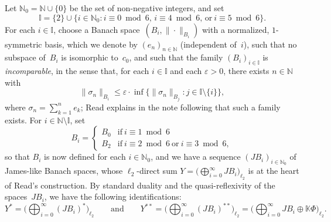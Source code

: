\documentclass[12pt,reqno]{amsart}
\theoremstyle{definition}
\numberwithin{equation}{section}
\renewcommand{\le}{\ensuremath{\leqslant}}
\newcommand{\N}{\mathbb{N}}
\renewcommand{\epsilon}{\ensuremath{\varepsilon}}
\begin{document}
Let $\N_0 = \N\cup\{0\}$ be the set of non-negative integers, and set
\[ \mathbb{I} = \{2\}\cup\{i\in\N_0 : i\equiv 0\bmod 6,\, i\equiv 
4\bmod 6,\, \text{or}\ i\equiv 5\bmod 6\}. \] For each
$i\in\mathbb{I}$, choose a Banach space~$(B_i,\|\cdot\|_{B_i})$ with a
normalized, $1$-symmetric basis, which we denote by $(e_n)_{n\in\N}$
(independent of~$i$), such that no subspace of~$B_i$ is isomorphic
to~$c_0$, and such that the family $(B_i)_{i\in\mathbb{I}}$ is
\emph{incomparable}, in the sense that, for each $i\in\mathbb{I}$ and
each $\epsilon>0$, there exists $n\in\N$ with
\begin{equation}\label{ReadDefIncomp}
\|\sigma_n\|_{B_i}\le\epsilon\cdot\inf\bigl\{\|\sigma_n\|_{B_j} :
j\in\mathbb{I}\setminus\{i\}\bigr\}, \end{equation} where $\sigma_n = \sum_{k=1}^n
e_k$; Read explains in the note following \cite[Definition~3.2]{read}
that such a family exists. For $i\in\N\setminus\mathbb{I}$, set
\begin{equation}\label{subspaceYiforinotinI} 
 B_i = \begin{cases} B_0 & \text{if}\ i\equiv 1\bmod 6\\ B_2 &
   \text{if}\ i\equiv 2\bmod 6\ \text{or}\ i\equiv 3\bmod
   6, \end{cases} \end{equation} so that $B_i$ is now defined for each
$i\in\N_0$, and we have a sequence $(JB_i)_{i\in\N_0}$ of
James-like Banach spaces, whose $\ell_2$-direct sum $Y =
\bigl(\bigoplus_{i=0}^\infty JB_i\bigr)_{\ell_2}$ is at the heart of
Read's construction.  By standard duality and the quasi-reflexivity of
the spaces~$JB_i$, we have the following identifications:
\begin{equation}\label{dualandbidualofY}
Y^* = \biggl(\bigoplus_{i=0}^\infty (JB_i)^*\biggr)_{\ell_2}\qquad
\text{and}\qquad Y^{**} = \biggl(\bigoplus_{i=0}^\infty
(JB_i)^{**}\biggr)_{\ell_2} = \biggl(\bigoplus_{i=0}^\infty
JB_i\oplus\mathbb{K}\Phi\biggr)_{\ell_2}.
\end{equation}
\end{document}
